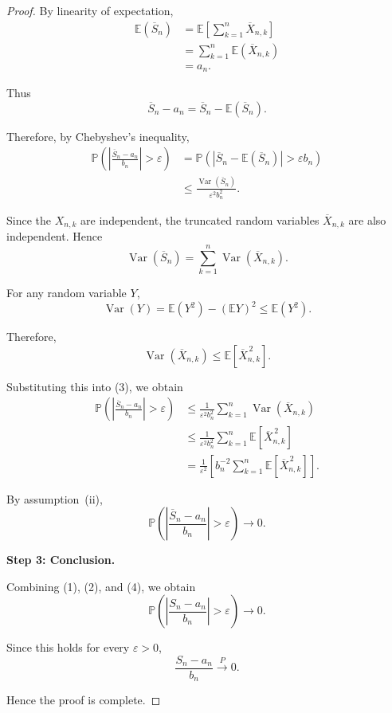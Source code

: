 \begin{proof}
By linearity of expectation,
\[
\begin{aligned}
\mathbb{E}(\overline{S}_n)
&=
\mathbb{E}
\left[
\sum_{k=1}^n\overline{X}_{n,k}
\right]\\
&=
\sum_{k=1}^n
\mathbb{E}(\overline{X}_{n,k})\\
&=
a_n.
\end{aligned}
\]

Thus
\[
\overline{S}_n-a_n
=
\overline{S}_n-\mathbb{E}(\overline{S}_n).
\]

Therefore, by Chebyshev's inequality,
\[
\begin{aligned}
\mathbb{P}
\left(
\left|
\frac{\overline{S}_n-a_n}{b_n}
\right|
>\varepsilon
\right)
&=
\mathbb{P}
\left(
|\overline{S}_n-\mathbb{E}(\overline{S}_n)|
>
\varepsilon b_n
\right)\\
&\leq
\frac{
\operatorname{Var}(\overline{S}_n)
}{
\varepsilon^2b_n^2
}.
\end{aligned}
\tag{3}
\]

Since the $X_{n,k}$ are independent, the truncated random variables
$\overline{X}_{n,k}$ are also independent. Hence
\[
\operatorname{Var}(\overline{S}_n)
=
\sum_{k=1}^n
\operatorname{Var}(\overline{X}_{n,k}).
\]

For any random variable $Y$,
\[
\operatorname{Var}(Y)
=
\mathbb{E}(Y^2)-(\mathbb{E}Y)^2
\leq
\mathbb{E}(Y^2).
\]

Therefore,
\[
\operatorname{Var}(\overline{X}_{n,k})
\leq
\mathbb{E}
\left[
\overline{X}_{n,k}^{\,2}
\right].
\]

Substituting this into (3), we obtain
\[
\begin{aligned}
\mathbb{P}
\left(
\left|
\frac{\overline{S}_n-a_n}{b_n}
\right|
>\varepsilon
\right)
&\leq
\frac{1}{\varepsilon^2b_n^2}
\sum_{k=1}^n
\operatorname{Var}(\overline{X}_{n,k})\\
&\leq
\frac{1}{\varepsilon^2b_n^2}
\sum_{k=1}^n
\mathbb{E}
\left[
\overline{X}_{n,k}^{\,2}
\right]\\
&=
\frac{1}{\varepsilon^2}
\left[
b_n^{-2}
\sum_{k=1}^n
\mathbb{E}
\left[
\overline{X}_{n,k}^{\,2}
\right]
\right].
\end{aligned}
\]

By assumption~\textnormal{(ii)},
\[
\boxed{
\mathbb{P}
\left(
\left|
\frac{\overline{S}_n-a_n}{b_n}
\right|
>\varepsilon
\right)
\longrightarrow0.
}
\tag{4}
\]

\medskip

\noindent
\textbf{Step 3: Conclusion.}

Combining (1), (2), and (4), we obtain
\[
\mathbb{P}
\left(
\left|
\frac{S_n-a_n}{b_n}
\right|
>\varepsilon
\right)
\longrightarrow0.
\]

Since this holds for every $\varepsilon>0$,
\[
\boxed{
\frac{S_n-a_n}{b_n}
\xrightarrow{P}0.
}
\]

Hence the proof is complete.

\end{proof}


